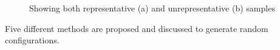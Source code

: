 \documentclass[a4paper,11pt]{report}
\newcommand{\figa}{
    \begin{figure}[!htpb]
    \centering
}
\newcommand{\figb}[2]{
    \caption{#1}
    \label{#2}
    \end{figure}
}
\begin{document}
\figa
\figb{Showing both representative (a) and unrepresentative (b) samples}{fig:reprrand}

Five different methods are proposed and discussed to generate random 
configurations.
\end{document}
